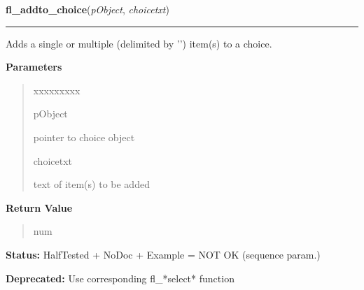 \hspace{.8\funcindent}\begin{boxedminipage}{\funcwidth}

    \raggedright \textbf{fl\_addto\_choice}(\textit{pObject}, \textit{choicetxt})

    \vspace{-1.5ex}

    \rule{\textwidth}{0.5\fboxrule}
\setlength{\parskip}{2ex}
    Adds a single or multiple (delimited by '{\textbar}') item(s) to a 
    choice.

\setlength{\parskip}{1ex}
      \textbf{Parameters}
      \vspace{-1ex}

      \begin{quote}
        \begin{Ventry}{xxxxxxxxx}

          \item[pObject]

          pointer to choice object

          \item[choicetxt]

          text of item(s) to be added

        \end{Ventry}

      \end{quote}

      \textbf{Return Value}
    \vspace{-1ex}

      \begin{quote}
      num

      \end{quote}

\textbf{Status:} HalfTested + NoDoc + Example = NOT OK (sequence param.)



\textbf{Deprecated:} Use corresponding fl\_*select* function



    \end{boxedminipage}

    \label{xformslib:library:fl_replace_choice}

    \vspace{0.5ex}

